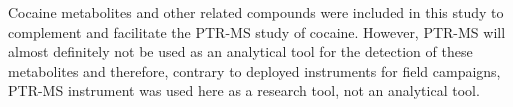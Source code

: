 



%



Cocaine metabolites and other related compounds were included in this study to complement and facilitate the PTR-MS study of cocaine.
%
However, PTR-MS will almost definitely not be used as an analytical tool for the detection of these metabolites and therefore, contrary to  deployed instruments for field campaigns,  PTR-MS instrument was used here as a research tool, not an analytical tool.












































